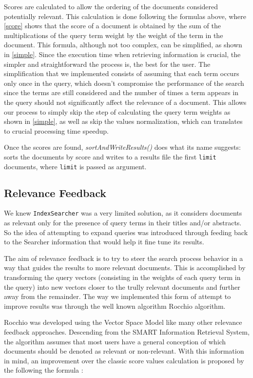 \documentclass[12pt]{article}
\begin{document}
Scores are calculated to allow the ordering of the documents considered potentially
relevant. This calculation is done following the formulas above, where \ref{score} 
shows that the score of a document is obtained by the sum of the multiplications 
of the query term weight by the weight of the term in the document. 
This formula, although not too complex, can be simplified, as shown in \ref{simple}. 
Since the execution time when retrieving information is crucial, the simpler and 
straightforward the process is, the best for the user. 
The simplification that we implemented consists of assuming that each term occurs 
only once in the query, which doesn't compromise the performance of the search 
since the terms are still considered and the number of times a term appears in 
the query should not significantly affect the relevance of a document. 
This allows our process to simply skip the step of calculating the query term 
weights as shown in \ref{simple}, as well as skip the values normalization, which can translates to crucial processing time speedup.

Once the scores are found, \textit{sortAndWriteResults()} does what its name 
suggests: sorts the documents by score and writes to a results file the first 
\texttt{limit} documents, where \texttt{limit} is passed as argument.

\subsection{Relevance Feedback}\label{rocchio}

We knew \texttt{IndexSearcher} was a very limited solution, as it considers 
documents as relevant only for the presence of query terms in their titles 
and/or abstracts.
So the idea of attempting to expand queries was introduced through feeding back
to the Searcher information that would help it fine tune its results.

The aim of relevance feedback is to try to steer the search process behavior 
in a way that guides the results to more relevant documents.
This is accomplished by transforming the query vectors (consisting in the weights 
of each query term in the query) into new vectors closer to the trully
relevant documents and further away from the remainder.
The way we implemented this form of attempt to improve results was through the
well known algorithm Rocchio algorithm.

Rocchio was developed using the Vector Space Model like many other relevance 
feedback approaches. 
Descending from the SMART Information Retrieval System, the algorithm assumes 
that most users have a general conception of which documents should be denoted 
as relevant or non-relevant. 
With this information in mind, an improvement over the classic score values 
calculation is proposed by the following the formula \cite{rocchio}:
\end{document}
